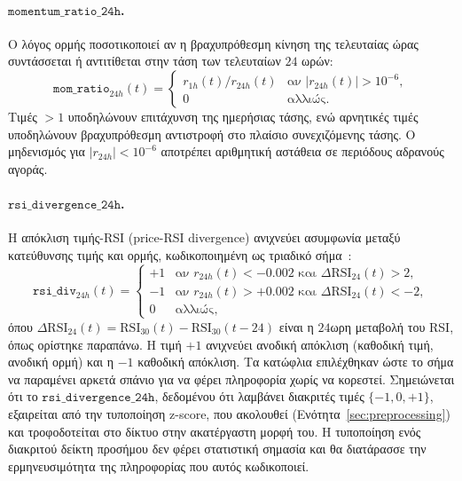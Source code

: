 \paragraph{$\mathtt{momentum\_ratio\_24h}$.}
Ο λόγος ορμής ποσοτικοποιεί αν η βραχυπρόθεσμη κίνηση της τελευταίας ώρας
συντάσσεται ή αντιτίθεται στην τάση των τελευταίων $24$ ωρών:
\begin{equation}
  \mathtt{mom\_ratio}_{24h}(t) =
  \begin{cases}
    r_{1h}(t) / r_{24h}(t) & \text{αν } |r_{24h}(t)| > 10^{-6},\\
    0 & \text{αλλιώς.}
  \end{cases}
  \label{eq:momratio}
\end{equation}
Τιμές $> 1$ υποδηλώνουν επιτάχυνση της ημερήσιας τάσης, ενώ αρνητικές τιμές
υποδηλώνουν βραχυπρόθεσμη αντιστροφή στο πλαίσιο συνεχιζόμενης τάσης. Ο
μηδενισμός για $|r_{24h}| < 10^{-6}$ αποτρέπει αριθμητική αστάθεια σε
περιόδους αδρανούς αγοράς.

\paragraph{$\mathtt{rsi\_divergence\_24h}$.}
Η απόκλιση τιμής-RSI (price-RSI divergence) ανιχνεύει ασυμφωνία μεταξύ
κατεύθυνσης τιμής και ορμής, κωδικοποιημένη ως τριαδικό σήμα~\cite{wilder1978}:
\begin{equation}
  \mathtt{rsi\_div}_{24h}(t) =
  \begin{cases}
    +1 & \text{αν } r_{24h}(t) < -0{.}002 \text{ και } \Delta\mathrm{RSI}_{24}(t) > 2,\\
    -1 & \text{αν } r_{24h}(t) > +0{.}002 \text{ και } \Delta\mathrm{RSI}_{24}(t) < -2,\\
     0 & \text{αλλιώς,}
  \end{cases}
  \label{eq:rsidiv}
\end{equation}
όπου $\Delta\mathrm{RSI}_{24}(t) = \mathrm{RSI}_{30}(t) - \mathrm{RSI}_{30}(t-24)$
είναι η $24$ωρη μεταβολή του RSI, όπως ορίστηκε παραπάνω. Η τιμή $+1$ ανιχνεύει ανοδική απόκλιση
(καθοδική τιμή, ανοδική ορμή) και η $-1$ καθοδική απόκλιση. Τα κατώφλια
επιλέχθηκαν ώστε το σήμα να παραμένει αρκετά σπάνιο για να φέρει πληροφορία
χωρίς να κορεστεί. Σημειώνεται ότι το $\mathtt{rsi\_divergence\_24h}$, δεδομένου ότι
λαμβάνει διακριτές τιμές $\{-1, 0, +1\}$, εξαιρείται από την τυποποίηση
z-score, που ακολουθεί (Ενότητα~\ref{sec:preprocessing}) και τροφοδοτείται στο δίκτυο 
στην ακατέργαστη μορφή του. Η τυποποίηση ενός διακριτού δείκτη προσήμου δεν
φέρει στατιστική σημασία και θα διατάρασσε την ερμηνευσιμότητα της
πληροφορίας που αυτός κωδικοποιεί.

